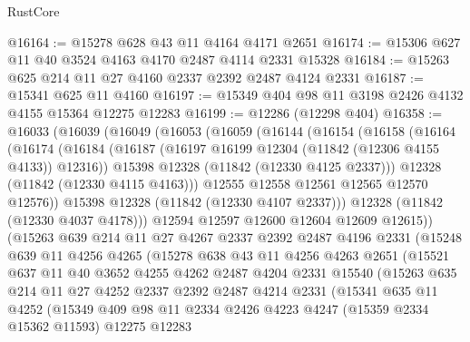 \begin{lexlean}{RustCore}
\begin{coremodule}
@16164 := @15278 @628 @43 @11 @4164 @4171 @2651
@16174 := @15306 @627 @11 @40 @3524 @4163 @4170 @2487 @4114 @2331 @15328
@16184 := @15263 @625 @214 @11 @27 @4160 @2337 @2392 @2487 @4124 @2331
@16187 := @15341 @625 @11 @4160
@16197 := @15349 @404 @98 @11 @3198 @2426 @4132 @4155 @15364 @12275 @12283
@16199 := @12286 (@12298 @404)
@16358 := @16033
    (@16039
      (@16049
        (@16053
          (@16059
            (@16144
              (@16154
                (@16158
                  (@16164
                    (@16174
                      (@16184
                        (@16187 (@16197 @16199 @12304 (@11842 (@12306 @4155 @4133)) @12316))
                        @15398
                        @12328
                        (@11842 (@12330 @4125 @2337)))
                      @12328
                      (@11842 (@12330 @4115 @4163)))
                    @12555
                    @12558
                    @12561
                    @12565
                    @12570
                    @12576))
                @15398
                @12328
                (@11842 (@12330 @4107 @2337)))
              @12328
              (@11842 (@12330 @4037 @4178)))
            @12594
            @12597
            @12600
            @12604
            @12609
            @12615))
        (@15263
          @639
          @214
          @11
          @27
          @4267
          @2337
          @2392
          @2487
          @4196
          @2331
          (@15248
            @639
            @11
            @4256
            @4265
            (@15278
              @638
              @43
              @11
              @4256
              @4263
              @2651
              (@15521
                @637
                @11
                @40
                @3652
                @4255
                @4262
                @2487
                @4204
                @2331
                @15540
                (@15263
                  @635
                  @214
                  @11
                  @27
                  @4252
                  @2337
                  @2392
                  @2487
                  @4214
                  @2331
                  (@15341
                    @635
                    @11
                    @4252
                    (@15349
                      @409
                      @98
                      @11
                      @2334
                      @2426
                      @4223
                      @4247
                      (@15359 @2334 @15362 @11593)
                      @12275
                      @12283

\end{coremodule}
\end{lexlean}

